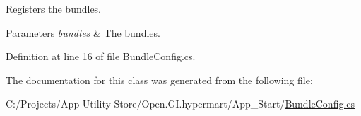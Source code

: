 Registers the bundles. 


\begin{DoxyParams}{Parameters}
{\em bundles} & The bundles.\\
\hline
\end{DoxyParams}


Definition at line 16 of file Bundle\+Config.\+cs.



The documentation for this class was generated from the following file\+:\begin{DoxyCompactItemize}
\item 
C\+:/\+Projects/\+App-\/\+Utility-\/\+Store/\+Open.\+G\+I.\+hypermart/\+App\+\_\+\+Start/\hyperlink{_bundle_config_8cs}{Bundle\+Config.\+cs}\end{DoxyCompactItemize}
